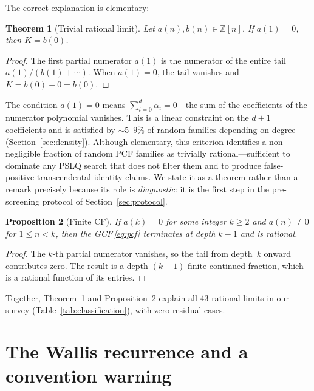 \documentclass[11pt]{amsart}
\newtheorem{theorem}{Theorem}
\newtheorem{proposition}[theorem]{Proposition}
\theoremstyle{definition}
\theoremstyle{remark}
\begin{document}
The correct explanation is elementary:

\begin{theorem}[Trivial rational limit]\label{thm:main}
  Let $a(n),b(n)\in\mathbb{Z}[n]$.
  If $a(1)=0$, then $K = b(0)$.
\end{theorem}

\begin{proof}
  The first partial numerator $a(1)$ is the numerator of the entire tail
  $a(1)/(b(1)+\cdots)$.  When $a(1)=0$, the tail vanishes and
  $K = b(0) + 0 = b(0)$.
\end{proof}

The condition $a(1)=0$ means $\sum_{i=0}^d \alpha_i = 0$---the sum
of the coefficients of the numerator polynomial vanishes.
This is a linear constraint on the $d+1$ coefficients and is satisfied
by $\sim\!5$--$9\%$ of random families depending on degree
(Section~\ref{sec:density}).
Although elementary, this criterion identifies a non-negligible
fraction of random PCF families as trivially rational---sufficient
to dominate any PSLQ search that does not filter them and to produce
false-positive transcendental identity claims.
We state it as a theorem rather than a remark precisely because its
role is \emph{diagnostic}: it is the first step in the pre-screening
protocol of Section~\ref{sec:protocol}.

\begin{proposition}[Finite CF]\label{prop:finite}
  If $a(k)=0$ for some integer $k\ge 2$ and $a(n)\ne 0$ for $1\le n<k$,
  then the GCF\,\eqref{eq:pcf} terminates at depth $k-1$ and is
  rational.
\end{proposition}

\begin{proof}
  The $k$-th partial numerator vanishes, so the tail from depth~$k$
  onward contributes zero.  The result is a depth-$(k-1)$ finite
  continued fraction, which is a rational function of its entries.
\end{proof}

Together, Theorem~\ref{thm:main} and Proposition~\ref{prop:finite}
explain all 43 rational limits in our survey (Table~\ref{tab:classification}),
with zero residual cases.

\section{The Wallis recurrence and a convention warning}\label{sec:wallis}
\end{document}
